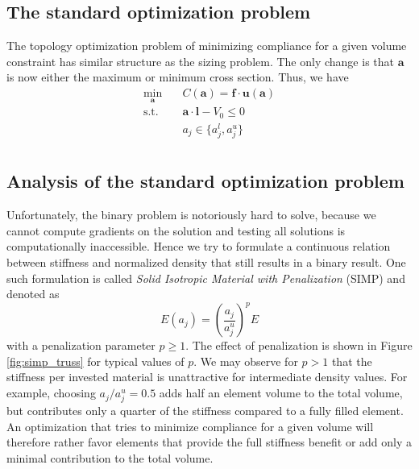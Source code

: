 \subsection{The standard optimization problem}
The topology optimization problem of minimizing compliance for a given volume constraint has similar structure as the sizing problem. The only change is that $\mathbf{a}$ is now either the maximum or minimum cross section. Thus, we have 
\begin{equation}
    \begin{aligned}
        \min_{\mathbf{a}} \quad & C(\mathbf{a}) = \mathbf{f} \cdot \mathbf{u}(\mathbf{a})\\
        \textrm{s.t.} \quad & \mathbf{a} \cdot \mathbf{l} - V_0 \le 0  \\
                            & a_j \in \{a_j^l, a_j^u\}\\
    \end{aligned}
    \label{eq:truss_topology_optimization}
\end{equation}

\subsection{Analysis of the standard optimization problem}
Unfortunately, the binary problem is notoriously hard to solve, because we cannot compute gradients on the solution and testing all solutions is computationally inaccessible. Hence we try to formulate a continuous relation between stiffness and normalized density that still results in a binary result. One such formulation is called \emph{Solid Isotropic Material with Penalization} (SIMP) and denoted as 
\begin{equation}
    E(a_j)= \left(\frac{a_j}{a_j^u}\right)^p E
\end{equation}
with a penalization parameter $p \ge 1$. 
The effect of penalization is shown in Figure \ref{fig:simp_truss} for typical values of $p$. We may observe for $p>1$ that the stiffness per invested material is unattractive for intermediate density values. For example, choosing $a_j/a_j^u=0.5$ adds half an element volume to the total volume, but contributes only a quarter of the stiffness compared to a fully filled element. An optimization that tries to minimize compliance for a given volume will therefore rather favor elements that provide the full stiffness benefit or add only a minimal contribution to the total volume.

